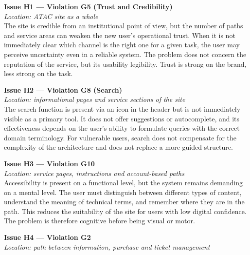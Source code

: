 ﻿\documentclass[11pt,a4paper]{article}
\begin{document}
\bigskip

\noindent\textbf{Issue H1 --- Violation G5 (Trust and Credibility)}\label{atac:H1}\\
\textit{Location: ATAC site as a whole}\\

\noindent The site is credible from an institutional point of view, but the number of paths and service areas can weaken the new user's operational trust. When it is not immediately clear which channel is the right one for a given task, the user may perceive uncertainty even in a reliable system. The problem does not concern the reputation of the service, but its usability legibility. Trust is strong on the brand, less strong on the task.

\bigskip

\noindent\textbf{Issue H2 --- Violation G8 (Search)}\label{atac:H2}\\
\textit{Location: informational pages and service sections of the site}\\

\noindent The search function is present via an icon in the header but is not immediately visible as a primary tool. It does not offer suggestions or autocomplete, and its effectiveness depends on the user's ability to formulate queries with the correct domain terminology. For vulnerable users, search does not compensate for the complexity of the architecture and does not replace a more guided structure.

\bigskip

\noindent\textbf{Issue H3 --- Violation G10}\label{atac:H3}\\
\textit{Location: service pages, instructions and account-based paths}\\

\noindent Accessibility is present on a functional level, but the system remains demanding on a mental level. The user must distinguish between different types of content, understand the meaning of technical terms, and remember where they are in the path. This reduces the suitability of the site for users with low digital confidence. The problem is therefore cognitive before being visual or motor.

\bigskip

\noindent\textbf{Issue H4 --- Violation G2}\label{atac:H4}\\
\textit{Location: path between information, purchase and ticket management}\\
\end{document}
